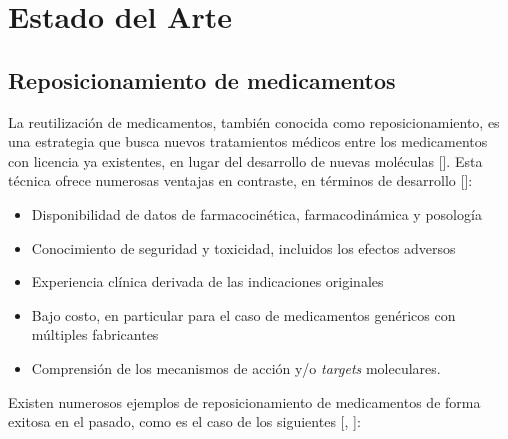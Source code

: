 \chapter{Estado del Arte}\label{chapter:state-of-the-art}

\section{Reposicionamiento de medicamentos}

La reutilización de medicamentos, también conocida como reposicionamiento, es una estrategia que busca nuevos tratamientos médicos entre los medicamentos con licencia ya existentes, en lugar del desarrollo de nuevas moléculas [\cite{repurposingconcept}]. Esta técnica ofrece numerosas ventajas en contraste, en términos de desarrollo [\cite{redo}]:
\begin{itemize}
    \item Disponibilidad de datos de farmacocinética, farmacodinámica y posología
    \item Conocimiento de seguridad y toxicidad, incluidos los efectos adversos
    \item Experiencia clínica derivada de las indicaciones originales
    \item Bajo costo, en particular para el caso de medicamentos genéricos con múltiples fabricantes
    \item Comprensión de los mecanismos de acción y/o \textit{targets} moleculares.
\end{itemize}
Existen numerosos ejemplos de reposicionamiento de medicamentos de forma exitosa en el pasado, como es el caso de los siguientes [\cite{drexamples}, \cite{drexamples2}]:
